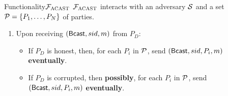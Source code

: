 \documentclass{llncs}
\begin{document}
\begin{boxdef}{Functionality}{$\mathcal{{F}}_{\textsc{ACAST}}$}
  $\mathcal{{F}}_{\textsc{ACAST}}$ interacts with an adversary $\mathcal{{S}}$ and a set $\mathcal{{P}} = \{
  P_1, \ldots, P_N \}$ of parties.
  \begin{enumerate}
    \item Upon receiving $({\sf Bcast}, sid, m)$ from $P_D$:
    
    \begin{itemize}
      \item If $P_D$ is honest, then, for each $P_i$ in $\mathcal{{P}}$, send $({\sf
      Bcast}, sid, P_i, m)$ {\bf eventually}.
      
      \item If $P_D$ is corrupted, then {\bf possibly}, for each $P_i$ in $\mathcal{{P}}$,
      send $({\sf Bcast}, sid, P_i, m)$ {\bf eventually}.
      \end{itemize}
  \end{enumerate}
\end{boxdef}

\begin{comment}
\begin{boxdef}{Functionality}{$\Func{ACAST}(D, P_1, \ldots, P_N)$}
  Assume $N > 3f$ for $f$ Byzantine failures.
  \begin{enumerate}[leftmargin=0cm]
    \item[] On send(x) from $D$:
    \begin{itemize}
      \item[] If $D$ is honest:
      \begin{itemize}
        \item[] For each $P_i$:
        \begin{itemize}
          \item[] Eventually send(x) to $P_i$.
        \end{itemize}
      \end{itemize}

      \item[] If $D$ is corrupt:
      \begin{itemize}
      \item[] Possibly:
        \begin{itemize}
          \item[] For each $P_i$:
          \begin{itemize}
            \item[] Eventually send(x) to $P_i$.
          \end{itemize}
        \end{itemize}
      \end{itemize}
    \end{itemize}
  \end{enumerate}
\end{boxdef}

\begin{boxdef}{ILC}{$\Func{ACAST}$}

\end{boxdef}
\end{comment}
\end{document}
